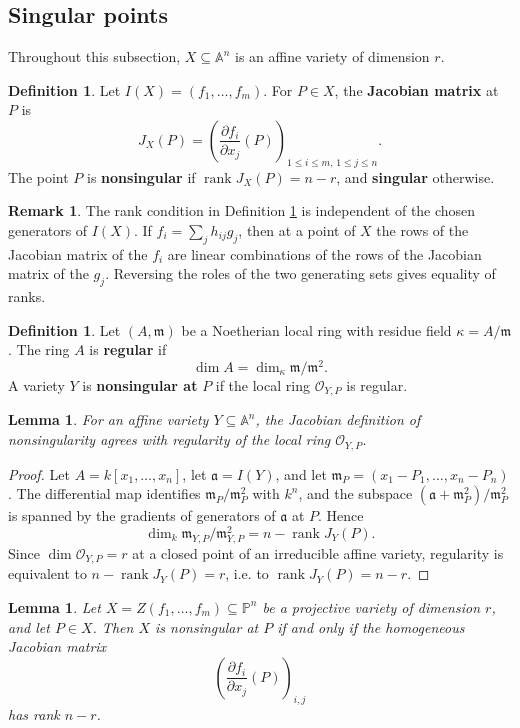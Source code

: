 \documentclass[12pt]{article}
\theoremstyle{plain}
\newtheorem{lemma}[thm]{Lemma}
\theoremstyle{definition}
\newtheorem{defn}[thm]{Definition} %
\newtheorem{remark}[thm]{Remark}
\newcommand{\bb}[1]{\mathbb{#1}}
\begin{document}
\subsection{Singular points}
Throughout this subsection, $X\subseteq\bb A^n$ is an affine variety of dimension $r$.
\begin{defn}\label{def:singular_point}
Let $I(X)=(f_1,\ldots,f_m)$. For $P\in X$, the \textbf{Jacobian matrix} at $P$ is
\[
J_X(P)=\left(\frac{\partial f_i}{\partial x_j}(P)\right)_{1\leq i\leq m,\,1\leq j\leq n}.
\]
The point $P$ is \textbf{nonsingular} if $\operatorname{rank}J_X(P)=n-r$, and \textbf{singular} otherwise.
\end{defn}
\begin{remark}\label{rmk:defining_functions_invariant}
The rank condition in Definition \ref{def:singular_point} is independent of the chosen generators of $I(X)$. If $f_i=\sum_j h_{ij}g_j$, then at a point of $X$ the rows of the Jacobian matrix of the $f_i$ are linear combinations of the rows of the Jacobian matrix of the $g_j$. Reversing the roles of the two generating sets gives equality of ranks.
\end{remark}
\begin{defn}\label{def:regular_local}
Let $(A,\mathfrak m)$ be a Noetherian local ring with residue field $\kappa=A/\mathfrak m$. The ring $A$ is \textbf{regular} if
\[
\dim A=\dim_\kappa \mathfrak m/\mathfrak m^2.
\]
A variety $Y$ is \textbf{nonsingular at} $P$ if the local ring $\mathcal O_{Y,P}$ is regular.
\end{defn}
\begin{lemma}\label{lem:equivalence_singularity}
For an affine variety $Y\subseteq\bb A^n$, the Jacobian definition of nonsingularity agrees with regularity of the local ring $\mathcal O_{Y,P}$.
\end{lemma}
\begin{proof}
Let $A=k[x_1,\ldots,x_n]$, let $\mathfrak a=I(Y)$, and let $\mathfrak m_P=(x_1-P_1,\ldots,x_n-P_n)$. The differential map identifies $\mathfrak m_P/\mathfrak m_P^2$ with $k^n$, and the subspace $(\mathfrak a+\mathfrak m_P^2)/\mathfrak m_P^2$ is spanned by the gradients of generators of $\mathfrak a$ at $P$. Hence
\[
\dim_k \mathfrak m_{Y,P}/\mathfrak m_{Y,P}^2=n-\operatorname{rank}J_Y(P).
\]
Since $\dim\mathcal O_{Y,P}=r$ at a closed point of an irreducible affine variety, regularity is equivalent to $n-\operatorname{rank}J_Y(P)=r$, i.e. to $\operatorname{rank}J_Y(P)=n-r$.
\end{proof}
\begin{lemma}\label{lem:projective_jacobian}
Let $X=Z(f_1,\ldots,f_m)\subseteq\bb P^n$ be a projective variety of dimension $r$, and let $P\in X$. Then $X$ is nonsingular at $P$ if and only if the homogeneous Jacobian matrix
\[
\left(\frac{\partial f_i}{\partial x_j}(P)\right)_{i,j}
\]
has rank $n-r$.
\end{lemma}
\end{document}
